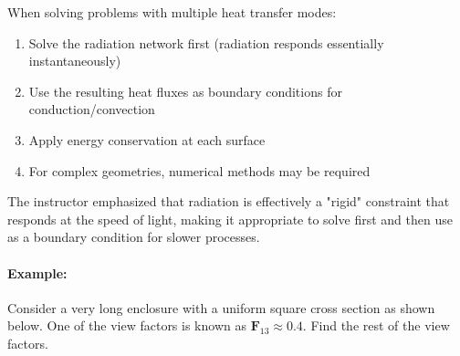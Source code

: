 When solving problems with multiple heat transfer modes:

\begin{enumerate}
    \item Solve the radiation network first (radiation responds essentially instantaneously)
    \item Use the resulting heat fluxes as boundary conditions for conduction/convection
    \item Apply energy conservation at each surface
    \item For complex geometries, numerical methods may be required
\end{enumerate}

The instructor emphasized that radiation is effectively a "rigid" constraint that responds at the speed of light, making it appropriate to solve first and then use as a boundary condition for slower processes.





\paragraph{Example: } Consider a very long enclosure with a uniform square cross section as shown below. One of the view factors is known as $\boldsymbol{F}_{13} \approx 0.4$. Find the rest of the view factors.

